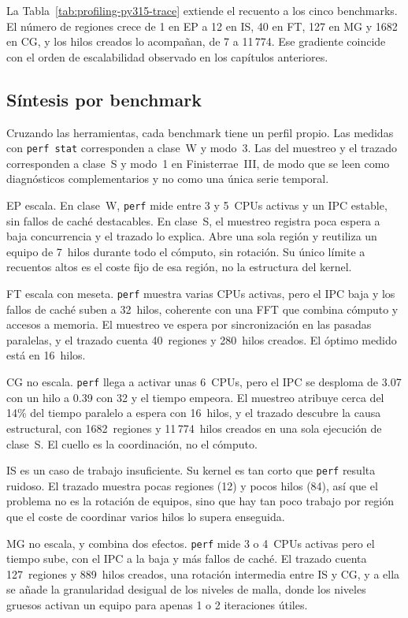 La Tabla~\ref{tab:profiling-py315-trace} extiende el recuento a los cinco
benchmarks. El número de regiones crece de 1 en EP a 12 en IS, 40 en FT, 127 en
MG y 1682 en CG, y los hilos creados lo acompañan, de 7 a 11\,774. Ese gradiente
coincide con el orden de escalabilidad observado en los capítulos anteriores.



\subsection{Síntesis por benchmark}
Cruzando las herramientas, cada benchmark tiene un perfil propio. Las medidas
con \texttt{perf stat} corresponden a clase~W y modo~3. Las del muestreo y el
trazado corresponden a clase~S y modo~1 en Finisterrae~III, de modo que se leen
como diagnósticos complementarios y no como una única serie temporal.

EP escala. En clase~W, \texttt{perf} mide entre 3 y 5~CPUs activas y un IPC
estable, sin fallos de caché destacables. En clase~S, el muestreo registra poca
espera a baja concurrencia y el trazado lo explica. Abre una sola región y
reutiliza un equipo de 7~hilos durante todo el cómputo, sin rotación. Su único
límite a recuentos altos es el coste fijo de esa región, no la estructura del
kernel.

FT escala con meseta. \texttt{perf} muestra varias CPUs activas, pero el IPC baja
y los fallos de caché suben a 32~hilos, coherente con una FFT que combina cómputo
y accesos a memoria. El muestreo ve espera por sincronización en las pasadas
paralelas, y el trazado cuenta 40~regiones y 280~hilos creados. El óptimo medido
está en 16~hilos.

CG no escala. \texttt{perf} llega a activar unas 6~CPUs, pero el IPC se desploma
de 3.07 con un hilo a 0.39 con 32 y el tiempo empeora. El muestreo atribuye cerca
del 14\% del tiempo paralelo a espera con 16~hilos, y el trazado descubre la
causa estructural, con 1682~regiones y 11\,774~hilos creados en una sola ejecución de
clase~S. El cuello es la coordinación, no el cómputo.

IS es un caso de trabajo insuficiente. Su kernel es tan corto que \texttt{perf}
resulta ruidoso. El trazado muestra pocas regiones (12) y pocos hilos (84), así
que el problema no es la rotación de equipos, sino que hay tan poco trabajo por
región que el coste de coordinar varios hilos lo supera enseguida.

MG no escala, y combina dos efectos. \texttt{perf} mide 3 o 4~CPUs activas pero
el tiempo sube, con el IPC a la baja y más fallos de caché. El trazado cuenta
127~regiones y 889~hilos creados, una rotación intermedia entre IS y CG, y a
ella se añade la granularidad desigual de los niveles de malla, donde los niveles
gruesos activan un equipo para apenas 1 o 2 iteraciones útiles.

